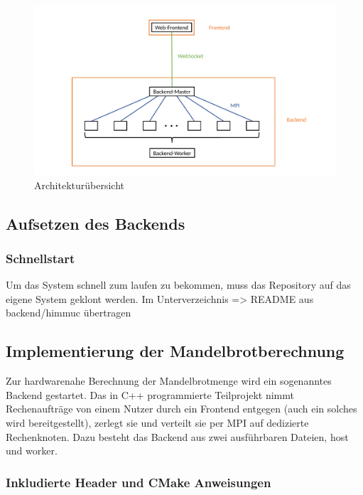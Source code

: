 \begin{figure}
    \centering
        \includegraphics[width=0.98\linewidth]{img/Implementierung/Kommunikation.pdf}
        \caption{Architekturübersicht}
    \label{fig:architekturuebersicht}
\end{figure}

\subsection{Aufsetzen des Backends}

\subsubsection{Schnellstart}

Um das System schnell zum laufen zu bekommen, muss das Repository auf das eigene System geklont werden.
Im Unterverzeichnis
=> README aus backend/himmuc übertragen

\subsection{Implementierung der Mandelbrotberechnung}

Zur hardwarenahe Berechnung der Mandelbrotmenge wird ein sogenanntes Backend gestartet.
Das in C++ programmierte Teilprojekt nimmt Rechenaufträge von einem Nutzer durch ein Frontend entgegen (auch
ein solches wird bereitgestellt), zerlegt sie und verteilt sie per MPI auf dedizierte Rechenknoten.
Dazu besteht das Backend aus zwei ausführbaren Dateien, host und worker. %

\subsubsection{Inkludierte Header und CMake Anweisungen}

